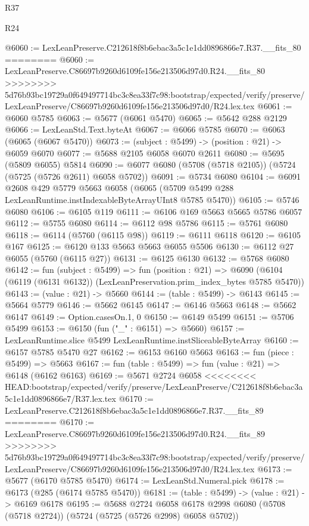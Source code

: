 \begin{lexlean}{R37}
\begin{lexlean}{R24}
\begin{coremodule}
{{{{{{{{{{{{{{{{{{{{{{{{{{{{{{{{{{{{{{{{{{{{{{{{{{{{{{{{{{{{{{{{{{{{{{{{{{{{{{{{{{{{{{{{{{{{{{{{{{{{{{{{{{{{{{{{{{{{{{{{{{{{{{{{{{{{{{{{{{{{{{{{{{{{{{{{{{{{{{{{{{{{{{{{{{{{{{{{{{{{{{{{{@6060 := LexLeanPreserve.C212618f8b6ebac3a5c1e1dd0896866e7.R37.__fits_80
========
@6060 := LexLeanPreserve.C86697b9260d6109fe156e213506d97d0.R24.__fits_80
>>>>>>>> 5d76b93bc19729a0f649497714bc3c8ea33f7c98:bootstrap/expected/verify/preserve/LexLeanPreserve/C86697b9260d6109fe156e213506d97d0/R24.lex.tex
@6061 := @6060 @5785
@6063 := @5677 (@6061 @5470)
@6065 := @5642 @288 @2129
@6066 := LexLeanStd.Text.byteAt
@6067 := @6066 @5785
@6070 := @6063 (@6065 (@6067 @5470))
@6073 := (subject : @5499) -> (position : @21) -> @6059 @6070
@6077 := @5688 @2105 @6058 @6070 @2611
@6080 := @5695 (@5809 @6055) @5814
@6090 := @6077 @6080 (@5708 (@5718 @2105)) (@5724 (@5725 (@5726 @2611) @6058 @5702))
@6091 := @5734 @6080
@6104 := @6091
    @2608
    @429
    @5779
    @5663
    @6058
    (@6065 (@5709 @5499 @288 LexLeanRuntime.instIndexableByteArrayUInt8 @5785 @5470))
@6105 := @5746 @6080
@6106 := @6105 @119
@6111 := @6106 @169 @5663 @5665 @5786 @6057
@6112 := @5755 @6080
@6114 := @6112 @98 @5786
@6115 := @5761 @6080
@6118 := @6114 (@5760 (@6115 @98))
@6119 := @6111 @6118
@6120 := @6105 @167
@6125 := @6120 @133 @5663 @5663 @6055 @5506
@6130 := @6112 @27 @6055 (@5760 (@6115 @27))
@6131 := @6125 @6130
@6132 := @5768 @6080
@6142 := fun (subject : @5499) =>
  fun (position : @21) =>
  @6090 (@6104 (@6119 (@6131 @6132)) (LexLeanPreservation.prim_index_bytes @5785 @5470))
@6143 := (value : @21) -> @5660
@6144 := (table : @5499) -> @6143
@6145 := @5664 @5779
@6146 := @5662 @6145
@6147 := @6146 @5663
@6148 := @5662 @6147
@6149 := Option.casesOn.{1, 0}
@6150 := @6149 @5499
@6151 := @5706 @5499
@6153 := @6150 (fun ("_" : @6151) => @5660)
@6157 := LexLeanRuntime.slice @5499 LexLeanRuntime.instSliceableByteArray
@6160 := @6157 @5785 @5470 @27
@6162 := @6153 @6160 @5663
@6163 := fun (piece : @5499) => @5663
@6167 := fun (table : @5499) => fun (value : @21) => @6148 (@6162 @6163)
@6169 := @5671 @2724 @6058
<<<<<<<< HEAD:bootstrap/expected/verify/preserve/LexLeanPreserve/C212618f8b6ebac3a5c1e1dd0896866e7/R37.lex.tex
@6170 := LexLeanPreserve.C212618f8b6ebac3a5c1e1dd0896866e7.R37.__fits_89
========
@6170 := LexLeanPreserve.C86697b9260d6109fe156e213506d97d0.R24.__fits_89
>>>>>>>> 5d76b93bc19729a0f649497714bc3c8ea33f7c98:bootstrap/expected/verify/preserve/LexLeanPreserve/C86697b9260d6109fe156e213506d97d0/R24.lex.tex
@6173 := @5677 (@6170 @5785 @5470)
@6174 := LexLeanStd.Numeral.pick
@6178 := @6173 (@285 (@6174 @5785 @5470))
@6181 := (table : @5499) -> (value : @21) -> @6169 @6178
@6195 := @5688
    @2724
    @6058
    @6178
    @2998
    @6080
    (@5708 (@5718 @2724))
    (@5724 (@5725 (@5726 @2998) @6058 @5702))
}}}}}}}}}}}}}}}}}}}}}}}}}}}}}}}}}}}}}}}}}}}}}}}}}}}}}}}}}}}}}}}}}}}}}}}}}}}}}}}}}}}}}}}}}}}}}}}}}}}}}}}}}}}}}}}}}}}}}}}}}}}}}}}}}}}}}}}}}}}}}}}}}}}}}}}}}}}}}}}}}}}}}}}}}}}}}}}}}}}}}}}}}
\end{coremodule}
\end{lexlean}
\end{lexlean}
